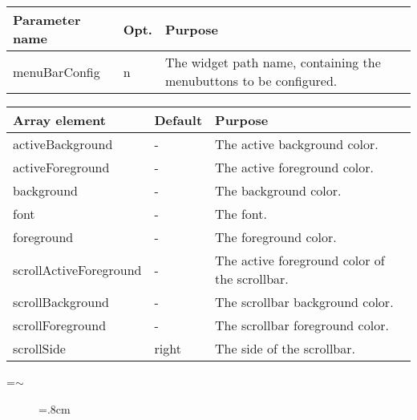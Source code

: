 {\newpage
\clearpage
\samepage \begin{tabular}{|l|l|p{6.5cm}|} \hline
Parameter name & Opt. & Purpose \\  \hline
menuBarConfig  & n    & The widget path name, containing the
                        menubuttons to be configured.\\  \hline
\end{tabular}
}

{\newpage
\clearpage
\samepage \begin{tabular}{|l|l|p{5.5cm}|} \hline
Array element          & Default & Purpose\\  \hline
activeBackground       & -       & The active background
                                   color.\\  \hline
activeForeground       & -       & The active foreground
                                   color.\\  \hline
background             & -       & The background color.\\  \hline
font                   & -       & The font.\\  \hline
foreground             & -       & The foreground color.\\  \hline
scrollActiveForeground & -       & The active foreground
                                   color of the scrollbar.\\  \hline 
scrollBackground       & -       & The scrollbar background
                                   color.\\  \hline
scrollForeground       & -       & The scrollbar foreground
                                   color.\\  \hline
scrollSide             & right   & The side of the
                                   scrollbar.\\  \hline
\end{tabular}
}

{\newpage
\clearpage
\samepage \setbox\sizebox=\hbox{$\sim$}\box\sizebox
}

{\newpage
\clearpage
\samepage \begin{figure}[ht]
  \centerline{
  \epsfysize=.8cm
  }
  
  \label{fig:MenuBar}
\end{figure}
}

{\newpage
\clearpage
\samepage \begin{figure}[ht]
  \centerline{
  \epsfysize=11.5cm
  }
  
  \label{fig:MenuBarConf}
\end{figure}
}

